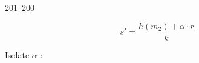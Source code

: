201~200~\documentclass{article}
\begin{document}
	                                                                        	                                                                    	                                	                    	                    	                        	                        	                    	                                                                	                	                                                                    	                    							                                                                                                                                                                                                    		                                                                                                                        	\[
	                                                                        	                                                                    	                                	                    	                    	                        	                        	                    	                                                                	                	                                                                    	                    							                                                                                                                                                                                                    		                                                                                                                        		s' = \frac{h(m_2) + \alpha \cdot r}{k}
	                                                                        	                                                                    	                                	                    	                    	                        	                        	                    	                                                                	                	                                                                    	                    							                                                                                                                                                                                                    		                                                                                                                        		\]

	                                                                        	                                                                    	                                	                    	                    	                        	                        	                    	                                                                	                	                                                                    	                    							                                                                                                                                                                                                    		                                                                                                                        		Isolate $\alpha$ :
\end{document}
